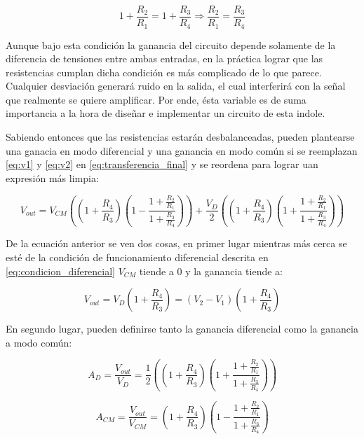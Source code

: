 \begin{equation}\label{eq:condicion_diferencial}
1 + \frac{R_2}{R_1} = 1 + \frac{R_3}{R_4} \Rightarrow \boxed{\frac{R_2}{R_1} = \frac{R_3}{R_4}}
\end{equation}

Aunque bajo esta condición la ganancia del circuito depende solamente de la diferencia de tensiones entre ambas entradas, en la práctica lograr que las resistencias cumplan dicha condición es más complicado de lo que parece. Cualquier desviación generará ruido en la salida, el cual interferirá con la señal que realmente se quiere amplificar. Por ende, ésta variable es de suma importancia a la hora de diseñar e implementar un circuito de esta indole. 

Sabiendo entonces que las resistencias estarán desbalanceadas, pueden plantearse una ganacia en modo diferencial y una ganancia en modo común si se reemplazan \ref{eq:v1} y \ref{eq:v2} en \ref{eq:transferencia_final} y se reordena para lograr uan expresión más limpia:

\begin{equation}\label{eq:ganancias_no_ideales}
V_{out} = V_{CM}((1 + \frac{R_4}{R_3})(1 - \frac{1 + \frac{R_2}{R_1}}{1 + \frac{R_3}{R_4}})) + \frac{V_D}{2}((1 + \frac{R_4}{R_3})(1 + \frac{1 + \frac{R_2}{R_1}}{1 + \frac{R_3}{R_4}}))
\end{equation}

De la ecuación anterior se ven dos cosas, en primer lugar mientras más cerca se esté de la condición de funcionamiento diferencial descrita en \ref{eq:condicion_diferencial} $V_{CM}$ tiende a 0 y la ganancia tiende a:

\begin{equation}\label{ganancia_diferencial_ideal}
\boxed{V_{out} = V_D(1 + \frac{R_4}{R_3}) = (V_2 - V_1)(1 + \frac{R_4}{R_3})}
\end{equation}


En segundo lugar, pueden definirse tanto la ganancia diferencial como la ganancia a modo común:

\begin{equation}\label{eq:ganancia_diferencial}
A_D = \frac{V_{out}}{V_D} = \frac{1}{2}((1 + \frac{R_4}{R_3})(1 + \frac{1 + \frac{R_2}{R_1}}{1 + \frac{R_3}{R_4}}))
\end{equation}

\begin{equation}\label{eq:ganancia_comun}
A_{CM} = \frac{V_{out}}{V_{CM}} = (1 + \frac{R_4}{R_3})(1 - \frac{1 + \frac{R_2}{R_1}}{1 + \frac{R_3}{R_4}})
\end{equation}

